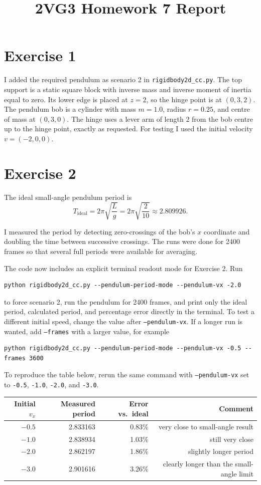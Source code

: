 \documentclass[11pt]{article}
\title{2VG3 Homework 7 Report}
\author{}
\date{}
\begin{document}
\maketitle

\section*{Exercise 1}
I added the required pendulum as scenario 2 in \texttt{rigidbody2d\_cc.py}. The top support is a static square block with inverse mass and inverse moment of inertia equal to zero. Its lower edge is placed at $z=2$, so the hinge point is at $(0,3,2)$. The pendulum bob is a cylinder with mass $m=1.0$, radius $r=0.25$, and centre of mass at $(0,3,0)$. The hinge uses a lever arm of length $2$ from the bob centre up to the hinge point, exactly as requested. For testing I used the initial velocity $v=(-2,0,0)$.

\section*{Exercise 2}
The ideal small-angle pendulum period is
\[
T_{\text{ideal}} = 2\pi \sqrt{\frac{L}{g}} = 2\pi \sqrt{\frac{2}{10}} \approx 2.809926.
\]

I measured the period by detecting zero-crossings of the bob's $x$ coordinate and doubling the time between successive crossings. The runs were done for 2400 frames so that several full periods were available for averaging.

The code now includes an explicit terminal readout mode for Exercise 2. Run
\begin{verbatim}
python rigidbody2d_cc.py --pendulum-period-mode --pendulum-vx -2.0
\end{verbatim}
to force scenario 2, run the pendulum for 2400 frames, and print only the ideal period, calculated period, and percentage error directly in the terminal. To test a different initial speed, change the value after \texttt{--pendulum-vx}. If a longer run is wanted, add \texttt{--frames} with a larger value, for example
\begin{verbatim}
python rigidbody2d_cc.py --pendulum-period-mode --pendulum-vx -0.5 --frames 3600
\end{verbatim}
To reproduce the table below, rerun the same command with \texttt{--pendulum-vx} set to \texttt{-0.5}, \texttt{-1.0}, \texttt{-2.0}, and \texttt{-3.0}.

\begin{table}[h]
\centering
\begin{tabular}{@{}rrrr@{}}
\toprule
Initial $v_x$ & Measured period & Error vs.\ ideal & Comment \\
\midrule
$-0.5$ & 2.833163 & 0.83\% & very close to small-angle result \\
$-1.0$ & 2.838934 & 1.03\% & still very close \\
$-2.0$ & 2.862197 & 1.86\% & slightly longer period \\
$-3.0$ & 2.901616 & 3.26\% & clearly longer than the small-angle limit \\
\bottomrule
\end{tabular}
\end{table}
\end{document}
